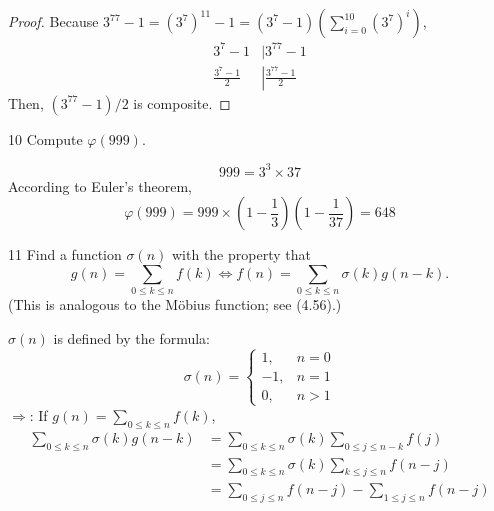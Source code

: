 \documentclass[a4paper,12pt]{article}
\makeatletter
\newtheorem*{solution}{Solution}
\theoremstyle{definition}
\renewenvironment{solution}[1][Solution] {\par\pushQED{\qed}\normalfont\topsep6\p@\@plus6\p@\relax\trivlist\item[\hskip\labelsep\bfseries#1\@addpunct{.}]\ignorespaces}{\popQED\endtrivlist\@endpefalse} \makeatother
\newenvironment{problems}{\begin{list}{}{\renewcommand{\makelabel}[1]{\textbf{##1}\hfil}}}{\end{list}}
\makeatother
\begin{document}
\begin{problems}
\begin{proof}
        Because $3^{77}-1=(3^7)^{11}-1=(3^7-1)\left(\sum_{i=0}^{10} (3^{7})^i\right)$, 
        \begin{align*}
            3^7-1 &| 3^{77}-1 \\
            \frac{3^7-1}{2} &\left| \frac{3^{77}-1}{2} \right. 
        \end{align*}
        Then, $(3^{77}-1)/2$ is composite.
    \end{proof} 
    \item[10] Compute $\varphi(999)$.
    \begin{solution}
        \begin{equation*}
            999= 3^3\times 37
        \end{equation*}
        According to Euler's theorem,
        \begin{equation*}
            \varphi(999) = 999 \times \left(1-\frac{1}{3}\right)\left(1-\frac{1}{37}\right)=648
        \end{equation*}
    \end{solution} 
    \item[11] Find a function $\sigma(n)$ with the property that
    \begin{equation*}
        g(n)=\sum_{0\leq k\leq n}f(k) \Leftrightarrow f(n)=\sum_{0\leq k\leq n}\sigma (k)g(n-k).
    \end{equation*} 
    (This is analogous to the M\"obius function; see (4.56).)
    \begin{solution}
        $\sigma(n)$ is defined by the formula:
        \begin{equation*}
            \sigma(n) = \begin{cases}
                1,&n=0\\
                -1,&n=1\\
                0,&n>1
            \end{cases}
        \end{equation*}
        $\Rightarrow$: If $g(n)=\sum_{0\leq k\leq n}f(k)$,
        \begin{align*}
            \sum_{0\leq k\leq n}\sigma (k)g(n-k) &= \sum_{0\leq k\leq n}\sigma (k)\sum_{0\leq j \leq n-k}f(j) \\
            &= \sum_{0\leq k\leq n}\sigma (k)\sum_{k\leq j \leq n}f(n-j) \\
            &= \sum_{0\leq j \leq n}f(n-j) - \sum_{1\leq j \leq n}f(n-j) \\

\end{align*}
\end{solution}
\end{problems}
\end{document}
